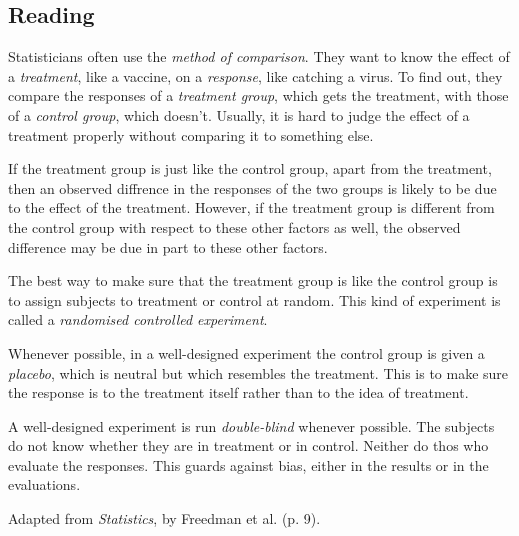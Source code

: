 



\subsection*{Reading}
Statisticians often use the \emph{method of comparison}. They want to know the effect of a \emph{treatment}, like a vaccine, on a \emph{response},
like catching a virus. To find out, they compare the responses of a \emph{treatment group}, which gets the treatment, with those of a \emph{control
group}, which doesn't. Usually, it is hard to judge the effect of a treatment properly without comparing it to something else.

If the treatment group is just like the control group, apart from the treatment, then an observed diffrence in the responses of the two groups
is likely to be due to the effect of the treatment. However, if the treatment group is different from the control group with respect to these
other factors as well, the observed difference may be due in part to these other factors.

The best way to make sure that the treatment group is like the control group is to assign subjects to treatment or control at random. This kind
of experiment is called a \emph{randomised controlled experiment}.

Whenever possible, in a well-designed experiment the control group is given a \emph{placebo}, which is neutral but which resembles the treatment.
This is to make sure the response is to the treatment itself rather than to the idea of treatment.

A well-designed experiment is run \emph{double-blind} whenever possible. The subjects do not know whether they are in treatment or in control.
Neither do thos who evaluate the responses. This guards against bias, either in the results or in the evaluations.

\begin{flushright}
  Adapted from \textit{Statistics}, by Freedman et al. (p. 9).
\end{flushright}


\clearpage
